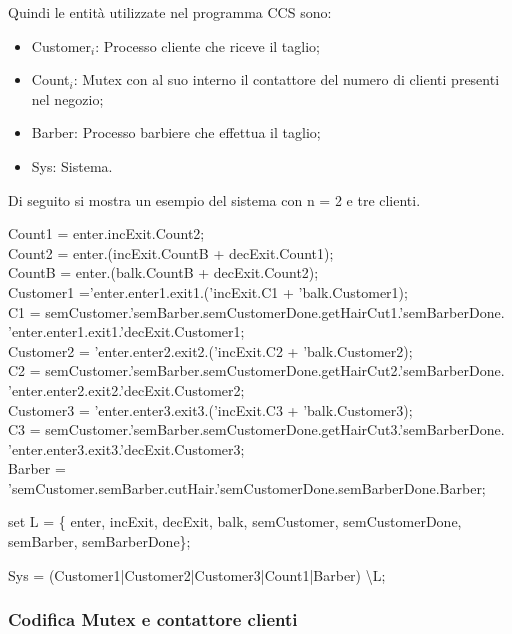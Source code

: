 Quindi le entità utilizzate nel programma CCS sono:
\begin{itemize}
	\item Customer$_{i}$: Processo cliente che riceve il taglio;
	\item Count$_{i}$: Mutex con al suo interno il contattore del numero di clienti presenti nel negozio;
	\item Barber: Processo barbiere che effettua il taglio;
	\item Sys: Sistema.
\end{itemize}

Di seguito si mostra un esempio del sistema con n = 2 e tre clienti.

Count1 = enter.incExit.Count2;\\
Count2 = enter.(incExit.CountB + decExit.Count1);\\
CountB = enter.(balk.CountB + decExit.Count2);\\

Customer1 ='enter.enter1.exit1.('incExit.C1 + 'balk.Customer1);\\
C1 = semCustomer.'semBarber.semCustomerDone.getHairCut1.'semBarberDone.\\'enter.enter1.exit1.'decExit.Customer1;\\

Customer2 = 'enter.enter2.exit2.('incExit.C2 + 'balk.Customer2);\\
C2 = semCustomer.'semBarber.semCustomerDone.getHairCut2.'semBarberDone.\\'enter.enter2.exit2.'decExit.Customer2;\\

Customer3 = 'enter.enter3.exit3.('incExit.C3 + 'balk.Customer3);\\
C3 = semCustomer.'semBarber.semCustomerDone.getHairCut3.'semBarberDone.\\'enter.enter3.exit3.'decExit.Customer3;\\

Barber = 'semCustomer.semBarber.cutHair.'semCustomerDone.semBarberDone.Barber;

set L = \{ enter, incExit, decExit, balk, semCustomer, semCustomerDone, semBarber, semBarberDone\};

Sys = (Customer1|Customer2|Customer3|Count1|Barber) \textbackslash L;\\

\subsubsection{Codifica Mutex e contattore clienti}

